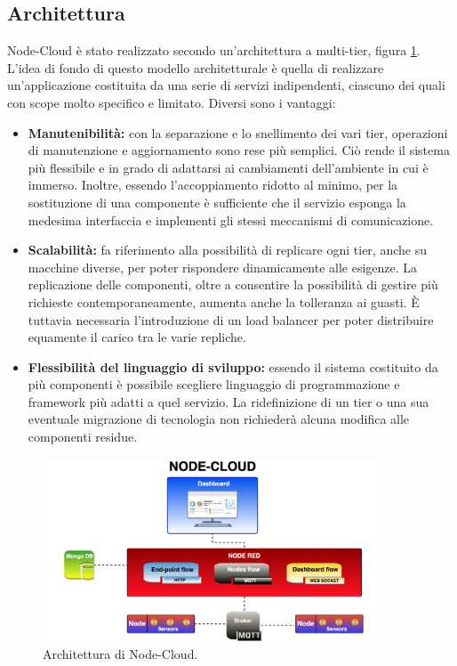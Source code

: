 \documentclass{article}
\begin{document}
\subsection{Architettura}
Node-Cloud è stato realizzato secondo un’architettura a multi-tier, figura \ref{fig:node-cloud-architecture}. L’idea di fondo di questo modello architetturale è quella di realizzare un’applicazione costituita da una serie di servizi indipendenti, ciascuno dei quali con scope molto specifico e limitato. 
Diversi sono i vantaggi:
\begin{itemize}
    \item \textbf{Manutenibilità:} con la separazione e lo snellimento dei vari tier, operazioni di manutenzione e aggiornamento sono rese più semplici. Ciò rende il sistema più flessibile e in grado di adattarsi ai cambiamenti dell’ambiente in cui è immerso. Inoltre, essendo l’accoppiamento ridotto al minimo, per la sostituzione di una componente è sufficiente che il servizio esponga la medesima interfaccia e implementi gli stessi meccanismi di comunicazione.
    \item \textbf{Scalabilità:} fa riferimento alla possibilità di replicare ogni tier, anche su macchine diverse, per poter rispondere dinamicamente alle esigenze. La replicazione delle componenti, oltre a consentire la possibilità di gestire più richieste contemporaneamente, aumenta anche la tolleranza ai guasti. È tuttavia necessaria l’introduzione di un load balancer per poter distribuire equamente il carico tra le varie repliche.
    \item[] \textbf{Flessibilità del linguaggio di sviluppo:} essendo il sistema costituito da più componenti è possibile scegliere linguaggio di programmazione e framework più adatti a quel servizio. La ridefinizione di un tier o una sua eventuale migrazione di tecnologia non richiederà alcuna modifica alle componenti residue.
\end{itemize}
\begin{figure}[htb]
    \centering
    \includegraphics[width=0.9\textwidth]{Node Cloud Architecture.png}
    \caption{Architettura di Node-Cloud.}
    \label{fig:node-cloud-architecture}
\end{figure}
\end{document}
